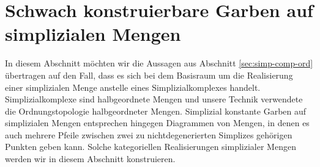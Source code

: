 
\section{Schwach konstruierbare Garben auf simplizialen Mengen}
\label{sec:simp-set-sk}

In diesem Abschnitt möchten wir die Aussagen aus Abschnitt
\ref{sec:simp-comp-ord} übertragen auf den Fall, dass es sich bei dem
Basisraum um die Realisierung einer simplizialen Menge anstelle eines
Simplizialkomplexes handelt. Simplizialkomplexe sind halbgeordnete
Mengen und unsere Technik verwendete die Ordnungstopologie
halbgeordneter Mengen. Simplizial konstante Garben auf simplizialen
Mengen entsprechen hingegen Diagrammen von Mengen, in denen es auch
mehrere Pfeile zwischen zwei zu nichtdegenerierten Simplizes gehörigen
Punkten geben kann. Solche kategoriellen Realisierungen simplizialer
Mengen werden wir in diesem Abschnitt konstruieren.

